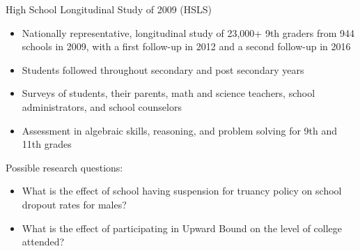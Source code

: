 \documentclass[
  8pt,
  ignorenonframetext,
  dvipsnames]{beamer}
\providecommand{\tightlist}{%
  \setlength{\itemsep}{0pt}\setlength{\parskip}{0pt}}
\let\olditem\item
\renewcommand{\item}{%
  \olditem\vspace{4pt}
}
\begin{document}
\begin{frame}{High School Longitudinal Study of 2009 (HSLS)}
\protect\hypertarget{high-school-longitudinal-study-of-2009-hsls}{}

\begin{itemize}
\tightlist
\item
  Nationally representative, longitudinal study of 23,000+ 9th graders
  from 944 schools in 2009, with a first follow-up in 2012 and a second
  follow-up in 2016
\item
  Students followed throughout secondary and post secondary years
\item
  Surveys of students, their parents, math and science teachers, school
  administrators, and school counselors
\item
  Assessment in algebraic skills, reasoning, and problem solving for 9th
  and 11th grades
\end{itemize}

\medskip

Possible research questions:

\begin{itemize}
\tightlist
\item
  What is the effect of school having suspension for truancy policy on
  school dropout rates for males?
\item
  What is the effect of participating in Upward Bound on the level of
  college attended?
\end{itemize}

\end{frame}
\end{document}

